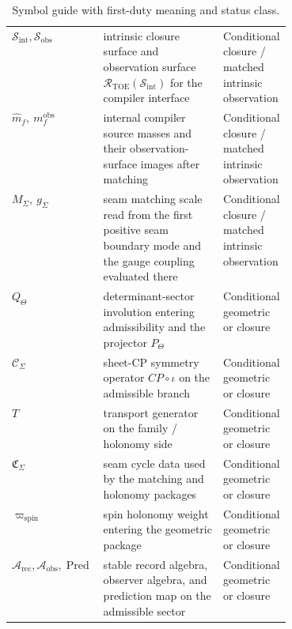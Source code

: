 \documentclass[11pt,a4paper]{article}
\theoremstyle{definition}
\theoremstyle{remark}
\newcommand{\inv}{\iota}
\newcommand{\Arec}{\mathcal A_{\mathrm{rec}}}
\newcommand{\Aobs}{\mathcal A_{\mathrm{obs}}}
\newcommand{\Pred}{\operatorname{Pred}}
\newcommand{\wspin}{\varpi_{\mathrm{spin}}}
\begin{document}
\begin{table}[t]
\begin{tabularx}{\linewidth}{@{}>{\raggedright\arraybackslash}p{0.23\linewidth}Y>{\raggedright\arraybackslash}p{0.18\linewidth}@{}}
$\mathcal S_{\mathrm{int}},\mathcal S_{\mathrm{obs}}$ & intrinsic closure surface and observation surface $\mathcal R_{\mathrm{TOE}}(\mathcal S_{\mathrm{int}})$ for the compiler interface & Conditional closure / matched intrinsic observation \\
$\hat m_f,\ m_f^{\mathrm{obs}}$ & internal compiler source masses and their observation-surface images after matching & Conditional closure / matched intrinsic observation \\
$M_\Sigma,\ g_\Sigma$ & seam matching scale read from the first positive seam boundary mode and the gauge coupling evaluated there & Conditional closure / matched intrinsic observation \\
$Q_\Theta$ & determinant-sector involution entering admissibility and the projector $P_\Theta$ & Conditional geometric or closure \\
$\mathcal C_\Sigma$ & sheet-CP symmetry operator $CP\circ\inv$ on the admissible branch & Conditional geometric or closure \\
$T$ & transport generator on the family / holonomy side & Conditional geometric or closure \\
$\mathfrak C_\Sigma$ & seam cycle data used by the matching and holonomy packages & Conditional geometric or closure \\
$\wspin$ & spin holonomy weight entering the geometric package & Conditional geometric or closure \\
$\Arec,\Aobs,\Pred$ & stable record algebra, observer algebra, and prediction map on the admissible sector & Conditional geometric or closure \\
\bottomrule
\end{tabularx}
\caption{Symbol guide with first-duty meaning and status class.}
\label{tab:symbol-guide}
\end{table}
\end{document}
